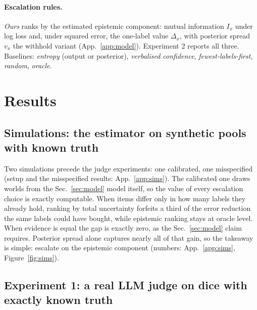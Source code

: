 \documentclass{article}
\newcommand{\secref}[1]{Sec.~\ref{#1}}
\begin{document}
\paragraph{Escalation rules.}
\emph{Ours} ranks by the estimated epistemic component: mutual information $I_x$
under log loss and, under squared error, the one-label value $\Delta_x$, with
posterior spread $v_x$ the withhold variant (App.~\ref{app:model}). Experiment 2
reports all three. Baselines: \emph{entropy} (output or
posterior), \emph{verbalised confidence}, \emph{fewest-labels-first},
\emph{random}, \emph{oracle}.

\section{Results}
\label{sec:results}

\subsection{Simulations: the estimator on synthetic pools with known truth}
\label{sec:sims}

Two simulations precede the judge experiments: one calibrated, one
misspecified (setup and the misspecified results: App.~\ref{app:sims}). The
calibrated one draws worlds from the \secref{sec:model} model itself, so the
value of every escalation choice is exactly computable. When items differ only
in how many labels they already hold, ranking by total uncertainty forfeits a
third of the error reduction the same labels could have bought, while
epistemic ranking stays at oracle level. When evidence is equal the gap is
exactly zero, as the \secref{sec:model} claim requires. Posterior spread alone
captures nearly all of that gain, so the takeaway is simple: escalate on the
epistemic component (numbers: App.~\ref{app:sims}, Figure~\ref{fig:sims}).

\subsection{Experiment 1: a real LLM judge on dice with exactly known truth}
\label{sec:exp1}
\end{document}
